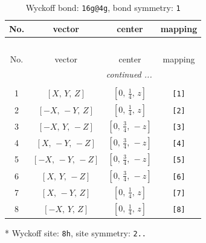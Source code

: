\documentclass[fleqn,8pt]{jsarticle}
\begin{document}
\begin{longtable}{cccc}
\caption{Wyckoff bond: {\tt 16g@4g}, bond symmetry: {\tt 1}}
 \\
 \hline \hline
No. & vector & center & mapping \\ \hline \endfirsthead

\multicolumn{3}{l}{\tablename\ \thetable{}} \\
 \hline \hline
No. & vector & center & mapping \\ \hline \endhead

 \hline \hline
\multicolumn{3}{r}{\footnotesize\it continued ...} \\ \endfoot

 \hline \hline
\multicolumn{3}{r}{} \\ \endlastfoot

1 & $\left[ X,\, Y,\, Z \right]$ & $\left[ 0,\, \frac{1}{4},\, z \right]$ & {\tt [1]} \\ \hline
2 & $\left[ - X,\, - Y,\, Z \right]$ & $\left[ 0,\, \frac{1}{4},\, z \right]$ & {\tt [2]} \\ \hline
3 & $\left[ - X,\, Y,\, - Z \right]$ & $\left[ 0,\, \frac{3}{4},\, - z \right]$ & {\tt [3]} \\ \hline
4 & $\left[ X,\, - Y,\, - Z \right]$ & $\left[ 0,\, \frac{3}{4},\, - z \right]$ & {\tt [4]} \\ \hline
5 & $\left[ - X,\, - Y,\, - Z \right]$ & $\left[ 0,\, \frac{3}{4},\, - z \right]$ & {\tt [5]} \\ \hline
6 & $\left[ X,\, Y,\, - Z \right]$ & $\left[ 0,\, \frac{3}{4},\, - z \right]$ & {\tt [6]} \\ \hline
7 & $\left[ X,\, - Y,\, Z \right]$ & $\left[ 0,\, \frac{1}{4},\, z \right]$ & {\tt [7]} \\ \hline
8 & $\left[ - X,\, Y,\, Z \right]$ & $\left[ 0,\, \frac{1}{4},\, z \right]$ & {\tt [8]} \\
\end{longtable}
* Wyckoff site: {\tt 8h}, site symmetry: {\tt 2..}
\renewcommand{\arraystretch}{1.2}
\end{document}
